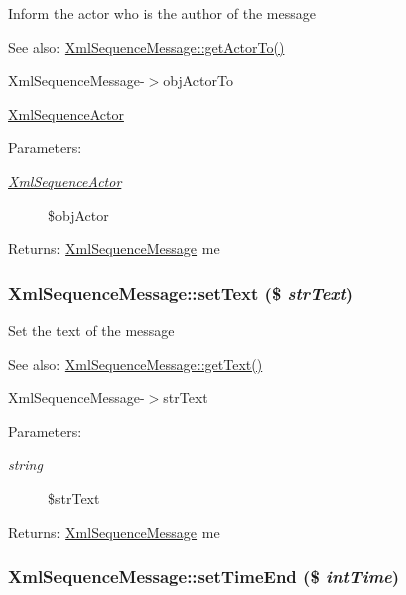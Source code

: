 Inform the actor who is the author of the message

\begin{Desc}
\item[See also:]\hyperlink{class_xml_sequence_message_d67a02882cb2602e3171f012650160f6}{XmlSequenceMessage::getActorTo()} 

XmlSequenceMessage-$>$objActorTo 

\hyperlink{class_xml_sequence_actor}{XmlSequenceActor} \end{Desc}
\begin{Desc}
\item[Parameters:]
\begin{description}
\item[{\em \hyperlink{class_xml_sequence_actor}{XmlSequenceActor}}]\$objActor \end{description}
\end{Desc}
\begin{Desc}
\item[Returns:]\hyperlink{class_xml_sequence_message}{XmlSequenceMessage} me \end{Desc}
\hypertarget{class_xml_sequence_message_a4d5880601982b4e882e52f657480cc5}{
\subsubsection[{setText}]{\setlength{\rightskip}{0pt plus 5cm}XmlSequenceMessage::setText (\$ {\em strText})}}
\label{class_xml_sequence_message_a4d5880601982b4e882e52f657480cc5}


Set the text of the message

\begin{Desc}
\item[See also:]\hyperlink{class_xml_sequence_message_1f80c7d126fc2183c3c99a71df3f1d20}{XmlSequenceMessage::getText()} 

XmlSequenceMessage-$>$strText \end{Desc}
\begin{Desc}
\item[Parameters:]
\begin{description}
\item[{\em string}]\$strText \end{description}
\end{Desc}
\begin{Desc}
\item[Returns:]\hyperlink{class_xml_sequence_message}{XmlSequenceMessage} me \end{Desc}
\hypertarget{class_xml_sequence_message_7fddd3ce13210832ec0ec73a751c332c}{
\subsubsection[{setTimeEnd}]{\setlength{\rightskip}{0pt plus 5cm}XmlSequenceMessage::setTimeEnd (\$ {\em intTime})}}
\label{class_xml_sequence_message_7fddd3ce13210832ec0ec73a751c332c}


